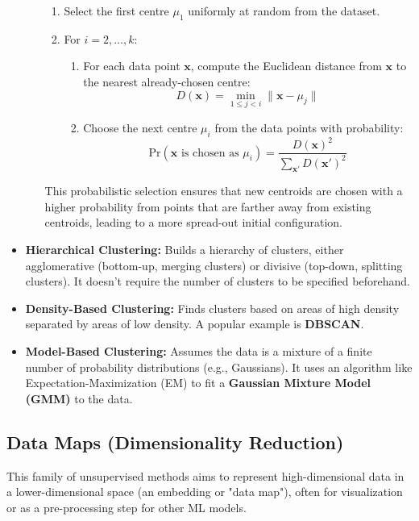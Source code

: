 \documentclass{article}
\begin{document}
\begin{multicols}{2}
\begin{itemize}
\begin{itemize}
			            \begin{enumerate}
				            \item Select the first centre $\mu_1$ uniformly at random from the dataset.
				            \item For $i = 2, \dots, k$:
				                  \begin{enumerate}[label=(\alph*)]
					                  \item For each data point $\mathbf{x}$, compute the Euclidean distance from $\mathbf{x}$ to the nearest already-chosen centre:
					                        $$
						                        D(\mathbf{x}) = \min_{1 \le j < i} \|\mathbf{x} - \mu_j\|
					                        $$
					                  \item Choose the next centre $\mu_i$ from the data points with probability:
					                        $$
						                        \text{Pr}(\mathbf{x} \text{ is chosen as } \mu_i) = \frac{D(\mathbf{x})^2}{\sum_{\mathbf{x}'} D(\mathbf{x}')^2}
					                        $$
				                  \end{enumerate}
			            \end{enumerate}
			            This probabilistic selection ensures that new centroids are chosen with a higher probability from points that are farther away from existing centroids, leading to a more spread-out initial configuration.
		      \end{itemize}
		\item \textbf{Hierarchical Clustering:} Builds a hierarchy of clusters, either agglomerative (bottom-up, merging clusters) or divisive (top-down, splitting clusters). It doesn't require the number of clusters to be specified beforehand.
		\item \textbf{Density-Based Clustering:} Finds clusters based on areas of high density separated by areas of low density. A popular example is \textbf{DBSCAN}.
		\item \textbf{Model-Based Clustering:} Assumes the data is a mixture of a finite number of probability distributions (e.g., Gaussians). It uses an algorithm like Expectation-Maximization (EM) to fit a \textbf{Gaussian Mixture Model (GMM)} to the data.
	\end{itemize}

	\subsection{Data Maps (Dimensionality Reduction)}
	This family of unsupervised methods aims to represent high-dimensional data in a lower-dimensional space (an embedding or "data map"), often for visualization or as a pre-processing step for other ML models.


\end{multicols}
\end{document}
